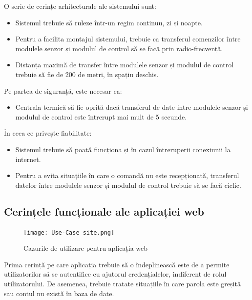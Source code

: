 	O serie de cerințe arhitecturale ale sistemului sunt:
	\begin{itemize}
		\setlength{\itemindent}{2em}
		\itemsep0em
		\item Sistemul trebuie să ruleze într-un regim continuu, zi și noapte.
		\item Pentru a facilita montajul sistemului, trebuie ca transferul comenzilor între modulele senzor și modulul de control să se facă prin radio-frecvență.
		\item Distanța maximă de transfer între modulele senzor și modulul de control trebuie să fie de 200 de metri, în spațiu deschis. 
	\end{itemize} 

\vspace{1em}

	Pe partea de siguranță, este necesar ca:
	\begin{itemize}
		\setlength{\itemindent}{2em}
		\itemsep0em
		\item Centrala termică să fie oprită dacă transferul de date intre modulele senzor și modulul de control este întrerupt mai mult de 5 secunde.
	\end{itemize}
	
\vspace{1em}

	În ceea ce privește fiabilitate:
	\begin{itemize}
		\setlength{\itemindent}{2em}
		\itemsep0em
		\item Sistemul trebuie să poată funcționa și în cazul întreruperii conexiunii la internet.
		\item Pentru a evita situațiile în care o comandă nu este recepționată, transferul datelor între modulele senzor și modulul de control trebuie să se facă ciclic.
	\end{itemize}

\subsection{Cerințele funcționale ale aplicației web}

\begin{figure}[H]
   	\centering
    	\texttt{[image: Use-Case site.png]}
	\caption{Cazurile de utilizare pentru aplicația web}
\end{figure}
	
	Prima cerință pe care aplicația trebuie să o îndeplinească este de a permite utilizatorilor să se autentifice cu ajutorul credențialelor, indiferent de rolul utilizatorului. De asemenea, trebuie tratate situațiile în care parola este greșită sau contul nu există în baza de date.

